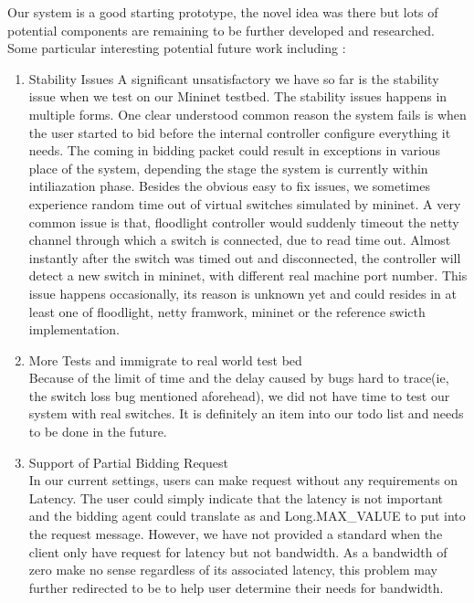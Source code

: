 \documentclass[a4paper,11pt,twocolumn]{article}
\begin{document}
Our system is a good starting prototype, the novel idea was there but lots of potential components are remaining to be 
further developed and researched. Some particular interesting potential future work including :
\begin{enumerate}

\item Stability Issues
A significant unsatisfactory we have so far is the stability issue when we test on our Mininet testbed. The stability issues happens in multiple forms.  One clear understood common reason the system fails is when the user started to bid before the internal controller configure everything it needs. The coming in bidding packet could result in exceptions in various place of the system, depending the stage the system is currently within intiliazation phase. Besides the obvious easy to fix issues, we sometimes experience random time out of virtual switches simulated by mininet. A very common issue is that, floodlight controller would suddenly timeout the netty channel through which a switch is connected, due to read time out. Almost instantly after the switch was timed out and disconnected, the controller will detect a new switch in mininet, with different real machine port number. This issue happens occasionally, its reason is unknown yet and could resides in at least one of floodlight, netty framwork, mininet  or the reference swicth implementation.

\item More Tests and immigrate to  real world test bed\\
Because of the limit of time and the delay caused by bugs hard to trace(ie, the switch loss bug mentioned aforehead), we did not have time to test our system with real switches. It is definitely an item into our todo list and needs to be done in the future.




\item Support of Partial  Bidding Request \\
In our current settings, users can make request without any requirements on Latency. The user could simply indicate that the latency is not important and the bidding agent  could translate as and Long.MAX\_VALUE to put into the request message. However, we have not provided a standard when the client only have request for latency but not bandwidth. As a bandwidth of zero make no sense regardless of its associated latency, this problem may further redirected to be to help user determine their needs for bandwidth.




\end{enumerate}
\end{document}
